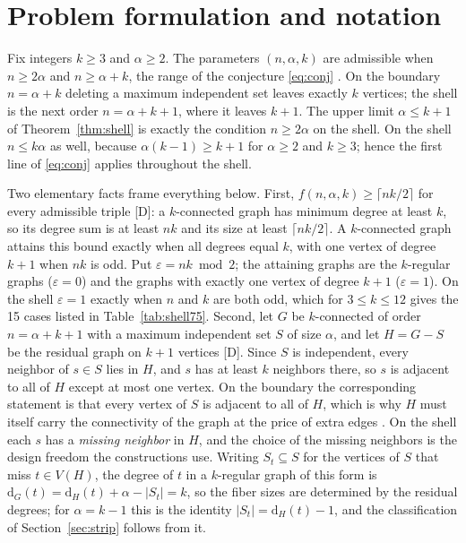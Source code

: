\documentclass[11pt]{article}
\theoremstyle{remark}
\newcommand{\dd}{\mathrm{d}}
\begin{document}
\section{Problem formulation and notation}\label{sec:formulation}

Fix integers $k\ge3$ and $\alpha\ge2$.
The parameters $(n,\alpha,k)$ are admissible when $n\ge2\alpha$ and $n\ge\alpha+k$, the range of the conjecture \eqref{eq:conj} \cite{BJ}.
On the boundary $n=\alpha+k$ deleting a maximum independent set leaves exactly $k$ vertices; the shell is the next order $n=\alpha+k+1$, where it leaves $k+1$.
The upper limit $\alpha\le k+1$ of Theorem~\ref{thm:shell} is exactly the condition $n\ge2\alpha$ on the shell.
On the shell $n\le k\alpha$ as well, because $\alpha(k-1)\ge k+1$ for $\alpha\ge2$ and $k\ge3$; hence the first line of \eqref{eq:conj} applies throughout the shell.

Two elementary facts frame everything below.
First, $f(n,\alpha,k)\ge\lceil nk/2\rceil$ for every admissible triple [D]: a $k$-connected graph has minimum degree at least $k$, so its degree sum is at least $nk$ and its size at least $\lceil nk/2\rceil$.
A $k$-connected graph attains this bound exactly when all degrees equal $k$, with one vertex of degree $k+1$ when $nk$ is odd.
Put $\varepsilon=nk\bmod2$; the attaining graphs are the $k$-regular graphs ($\varepsilon=0$) and the graphs with exactly one vertex of degree $k+1$ ($\varepsilon=1$).
On the shell $\varepsilon=1$ exactly when $n$ and $k$ are both odd, which for $3\le k\le12$ gives the 15 cases listed in Table~\ref{tab:shell75}.
Second, let $G$ be $k$-connected of order $n=\alpha+k+1$ with a maximum independent set $S$ of size $\alpha$, and let $H=G-S$ be the residual graph on $k+1$ vertices [D].
Since $S$ is independent, every neighbor of $s\in S$ lies in $H$, and $s$ has at least $k$ neighbors there, so $s$ is adjacent to all of $H$ except at most one vertex.
On the boundary the corresponding statement is that every vertex of $S$ is adjacent to all of $H$, which is why $H$ must itself carry the connectivity of the graph at the price of extra edges \cite{DG}.
On the shell each $s$ has a \emph{missing neighbor} in $H$, and the choice of the missing neighbors is the design freedom the constructions use.
Writing $S_t\subseteq S$ for the vertices of $S$ that miss $t\in V(H)$, the degree of $t$ in a $k$-regular graph of this form is $\dd_G(t)=\dd_H(t)+\alpha-|S_t|=k$, so the fiber sizes are determined by the residual degrees; for $\alpha=k-1$ this is the identity $|S_t|=\dd_H(t)-1$, and the classification of Section~\ref{sec:strip} follows from it.
\end{document}
